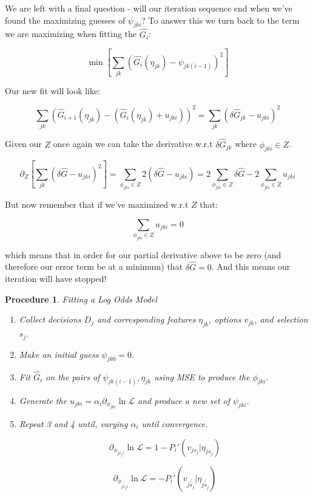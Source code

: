 \documentclass[11pt]{article}
\newtheorem{procedure}{Procedure}
\begin{document}
We are left with a final question - will our iteration sequence end when we've found the maximizing guesses of $\psi_{jki}$? To answer this we turn back to the term we are maximizing when fitting the $\hat{G_i}$: 

$$\min{\left[ \sum_{jk}\left(\hat{G_i}(\eta_{jk}) - \psi_{jk(i-1)}\right)^2 \right]}$$

Our new fit will look like:

$$\sum_{jk}\left(\hat{G}_{i+1}(\eta_{jk}) - (\hat{G}_i(\eta_{jk}) + u_{jki})\right)^2=\sum_{jk}\left( \delta \hat{G}_{jk} - u_{jki}\right)^2$$

Given our $Z$ once again we can take the derivative w.r.t $\delta \hat{G}_{jk}$ where $\phi_{jki} \in Z$. 

$$\partial_Z \left[ \sum_{jk}\left( \delta \hat{G} - u_{jki}\right)^2 \right] = \sum_{\phi_{jki} \in Z} 2\left( \delta \hat{G} - u_{jki}\right) = 2\sum_{\phi_{jki} \in Z} \delta \hat{G} - 2\sum_{\phi_{jki} \in Z} u_{jki}$$

But now remember that if we've maximized w.r.t $Z$ that:

$$\sum_{\phi_{jki} \in Z} u_{jki} = 0$$

which means that in order for our partial derivative above to be zero (and therefore our error term be at a minimum) that $\delta \hat{G}=0$. And this means our iteration will have stopped! 

\newpage

\begin{procedure}{Fitting a Log Odds Model}
\begin{enumerate}
\item Collect decisions $D_j$ and corresponding features $\eta_{jk}$, options $v_{jk}$, and selection $s_j$. 
\item Make an initial guess $\psi_{jk0} = 0$.
\item Fit $\hat{G}_i$ on the pairs of $\psi_{jk(i-1)},\eta_{jk}$ using MSE to produce the $\phi_{jki}$.
\item Generate the $u_{jki} = \alpha_i \partial_{\phi_{jki}} \ln{\mathcal{L}}$ and produce a new set of $\psi_{jki}$.
\item Repeat 3 and 4 until, varying $\alpha_i$ until convergence. 

$$\partial_{\phi_{js_ji}}\ln{\mathcal{L}}=1-P_i'(v_{js_j} | \eta_{js_j})$$ 

$$\partial_{\phi_{j\not{s_j}i}}\ln{\mathcal{L}}=-P_i'(v_{j\not{s_j}} | \eta_{j\not{s_j}})$$ 
\end{enumerate}

\end{procedure}
\end{document}
